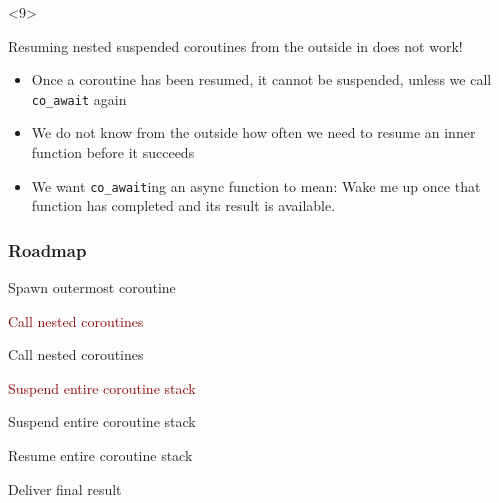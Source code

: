 \documentclass[aspectratio=169]{beamer}
\newif\iftransitions
\newcommand{\cpause}{\iftransitions \pause \fi}
\newcommand{\cmark}{\ding{51}}%
\newcommand{\xmark}{\ding{55}}%
\newcommand{\done}{\rlap{$\square$}{\raisebox{2pt}{\large\hspace{1pt}\cmark}}%
\hspace{-2.5pt}}
\newcommand{\wontfix}{\rlap{$\square$}{\large\hspace{1pt}\xmark}}
\begin{document}
\begin{frame}[fragile]
  \begin{onlyenv}<9>
  \end{onlyenv}

\end{frame}

\begin{frame}
  Resuming nested suspended coroutines from the outside in does not work!

  \cpause
  \begin{itemize}
  \item Once a coroutine has been resumed, it cannot be suspended, unless we call \texttt{co\_await} again \cpause
  \item We do not know from the outside how often we need to resume an inner function before it succeeds \cpause
  \item We want \texttt{co\_await}ing an async function to mean: Wake me up once that function has completed and its result is available.
  \end{itemize}

\end{frame}


\begin{frame}
  \frametitle{Roadmap}
  \begin{todolist}[label=$\square$]
  \item Spawn outermost coroutine
   {\item[\done] \textcolor{darkred}{Call nested coroutines}}
   {\item[\wontfix] Call nested coroutines}
   {\item[\done] \textcolor{darkred}{Suspend entire coroutine stack}}
   {\item[\wontfix] Suspend entire coroutine stack}
  \item Resume entire coroutine stack
  \item Deliver final result
  \end{todolist}
\end{frame}
\end{document}
